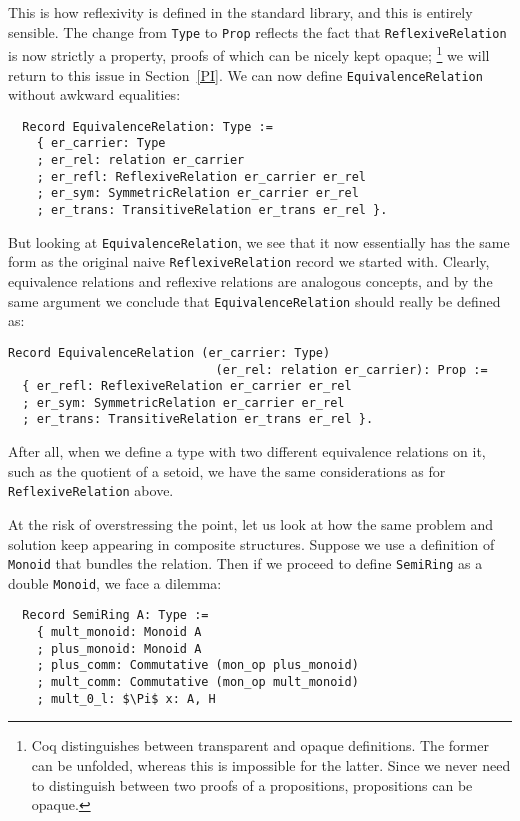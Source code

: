 \documentclass[a4paper,10pt,runningheads]{llncs}
\begin{document}
This is how reflexivity is defined in the standard library, and this is entirely sensible. The
change from \lstinline|Type| to \lstinline|Prop| reflects the fact that \lstinline|ReflexiveRelation| is now strictly a property,
proofs of which can be nicely kept opaque;%
\footnote{Coq distinguishes between transparent and opaque definitions. The former can be unfolded,
whereas this is impossible for the latter. Since we never need to distinguish between two proofs of
a propositions, propositions can be opaque.}
we will return to this issue in Section~\ref{PI}.
We can now define \lstinline|EquivalenceRelation| without awkward equalities:
\begin{lstlisting}
  Record EquivalenceRelation: Type :=
    { er_carrier: Type
    ; er_rel: relation er_carrier
    ; er_refl: ReflexiveRelation er_carrier er_rel
    ; er_sym: SymmetricRelation er_carrier er_rel
    ; er_trans: TransitiveRelation er_trans er_rel }.
\end{lstlisting}


But looking at \lstinline|EquivalenceRelation|, we see that it now essentially has the same form as the
original naive \lstinline|ReflexiveRelation| record we started with. Clearly, equivalence relations
and reflexive relations are analogous concepts, and by the same argument we
conclude that \lstinline|EquivalenceRelation| should really be defined as:

\begin{lstlisting}
Record EquivalenceRelation (er_carrier: Type)
                             (er_rel: relation er_carrier): Prop :=
  { er_refl: ReflexiveRelation er_carrier er_rel
  ; er_sym: SymmetricRelation er_carrier er_rel
  ; er_trans: TransitiveRelation er_trans er_rel }.
\end{lstlisting}


After all, when we define a type with
two different equivalence relations on it,
such as the quotient of a setoid,
we have the same considerations as for \lstinline|ReflexiveRelation| above.

At the risk of overstressing the point, let us look at how the same problem and solution keep
appearing in composite structures. Suppose we use a definition of \lstinline|Monoid| that bundles the
relation. Then if we proceed to define \lstinline|SemiRing| as a double \lstinline|Monoid|, we face a dilemma:
\begin{lstlisting}
  Record SemiRing A: Type :=
    { mult_monoid: Monoid A 
    ; plus_monoid: Monoid A 
    ; plus_comm: Commutative (mon_op plus_monoid)
    ; mult_comm: Commutative (mon_op mult_monoid)
    ; mult_0_l: $\Pi$ x: A, H
\end{lstlisting}
\end{document}
